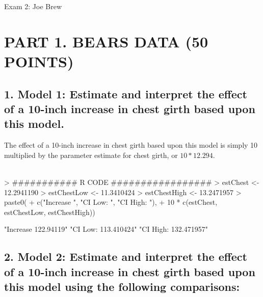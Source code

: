 \documentclass{article}
\begin{document}


\begin{center}
\begin{huge}
Exam 2: Joe Brew
\end{huge}
\end{center}


\tableofcontents



\newpage
\section*{PART 1. BEARS DATA (50 POINTS)}

\vspace{25mm}
\subsection*{1. Model 1: Estimate and interpret the effect of a 10-inch increase in chest girth based upon this model.}

The effect of a 10-inch increase in chest girth based upon this model is simply 10 multiplied by the parameter estimate for chest girth, or $10 * 12.294$. \\

\\


\begin{Schunk}
\begin{Sinput}
> ########### R CODE #################
> estChest <- 12.2941190
> estChestLow <- 11.3410424
> estChestHigh <- 13.2471957
> paste0(
+   c("Increase ", "CI Low: ", "CI High: "),
+        10 * c(estChest, estChestLow, estChestHigh))
\end{Sinput}
\begin{Soutput}
[1] "Increase 122.94119"  "CI Low: 113.410424"  "CI High: 132.471957"
\end{Soutput}
\end{Schunk}


\newpage
\subsection*{2. Model 2: Estimate and interpret the effect of a
10-inch increase in chest girth based upon this model
using the following comparisons:} \\
\end{document}
